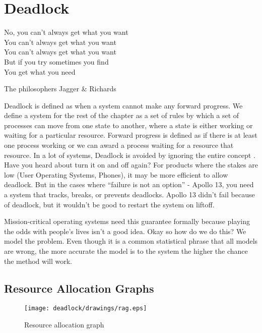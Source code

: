 \chapter{Deadlock}

\epigraph{No, you can't always get what you want
	\\You can't always get what you want
	\\You can't always get what you want
	\\But if you try sometimes you find
	\\You get what you need}{The philosophers Jagger \& Richards}

Deadlock is defined as when a system cannot make any forward progress.
We define a system for the rest of the chapter as a set of rules by which a set of processes can move from one state to another, where a state is either working or waiting for a particular resource.
Forward progress is defined as if there is at least one process working or we can award a process waiting for a resource that resource.
In a lot of systems, Deadlock is avoided by ignoring the entire concept \cite[P.237]{silberschatz2006operating}.
Have you heard about turn it on and off again?
For products where the stakes are low (User Operating Systems, Phones), it may be more efficient to allow deadlock.
But in the cases where ``failure is not an option'' - Apollo 13, you need a system that tracks, breaks, or prevents deadlocks.
Apollo 13 didn't fail because of deadlock, but it wouldn't be good to restart the system on liftoff.

Mission-critical operating systems need this guarantee formally because playing the odds with people's lives isn't a good idea.
Okay so how do we do this? We model the problem.
Even though it is a common statistical phrase that all models are wrong, the more accurate the model is to the system the higher the chance the method will work.

\section{Resource Allocation Graphs}

\begin{figure}[H]
	\centering
	\texttt{[image: deadlock/drawings/rag.eps]}
	\caption{Resource allocation graph}
	\label{ragfigure}
\end{figure}


